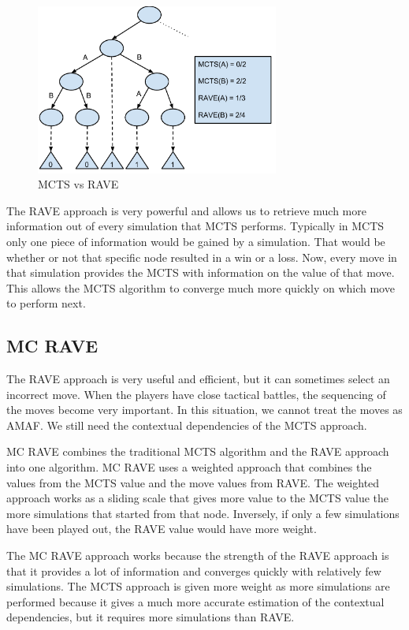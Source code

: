 \documentclass{sig-alternate}
\begin{document}
\begin{figure}[h]
	\includegraphics[width=8cm]{RAVEDiagram.pdf}
	\centering
	\caption{MCTS vs RAVE}
	\label{fig:RAVEDiagram}
\end{figure} 

The RAVE approach is very powerful and allows us to retrieve much more information out of every simulation that MCTS performs. Typically in MCTS only one piece of information would be gained by a simulation. That would be whether or not that specific node resulted in a win or a loss. Now, every move in that simulation provides the MCTS with information on the value of that move. This allows the MCTS algorithm to converge much more quickly on which move to perform next.

\subsection{MC RAVE}
The RAVE approach is very useful and efficient, but it can sometimes select an incorrect move\cite{RAVEinGo}. When the players have close tactical battles, the sequencing of the moves become very important. In this situation, we cannot treat the moves as AMAF. We still need the contextual dependencies of the MCTS approach.

MC RAVE combines the traditional MCTS algorithm and the RAVE approach into one algorithm. MC RAVE uses a weighted approach that combines the values from the MCTS value and the move values from RAVE. The weighted approach works as a sliding scale that gives more value to the MCTS value the more simulations that started from that node\cite{RAVEinGo}. Inversely, if only a few simulations have been played out, the RAVE value would have more weight.

The MC RAVE approach works because the strength of the RAVE approach is that it provides a lot of information and converges quickly with relatively few simulations. The MCTS approach is given more weight as more simulations are performed because it gives a much more accurate estimation of the contextual dependencies, but it requires more simulations than RAVE.
\end{document}
